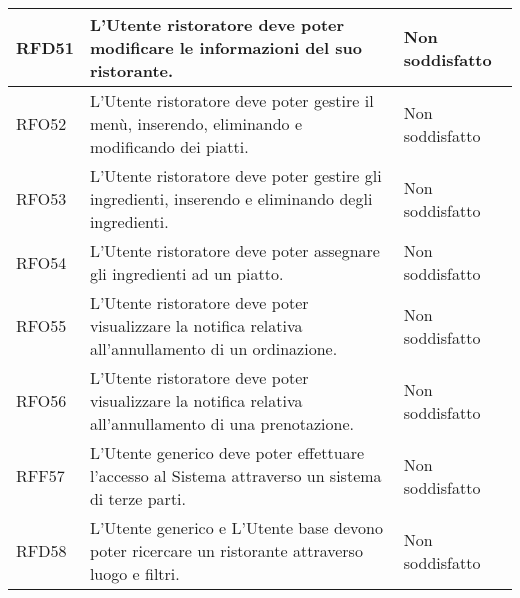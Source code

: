 \begin{longtable}{|l|p{}|p{3cm}|}
	\hline
	RFD51       & L'Utente ristoratore deve poter modificare le informazioni del suo ristorante.                                          & Non soddisfatto \\
	\hline
	RFO52       & L'Utente ristoratore deve poter gestire il menù, inserendo, eliminando e modificando dei piatti.                        & Non soddisfatto \\
	\hline
	RFO53       & L'Utente ristoratore deve poter gestire gli ingredienti, inserendo e eliminando degli ingredienti.                      & Non soddisfatto \\
	\hline
	RFO54       & L'Utente ristoratore deve poter assegnare gli ingredienti ad un piatto.                                                 & Non soddisfatto \\
	\hline
	RFO55       & L'Utente ristoratore deve poter visualizzare la notifica relativa all'annullamento di un ordinazione.                   & Non soddisfatto \\
	\hline
	RFO56       & L'Utente ristoratore deve poter visualizzare la notifica relativa all'annullamento di una prenotazione.                 & Non soddisfatto \\
	\hline
	RFF57       & L'Utente generico deve poter effettuare l'accesso al Sistema attraverso un sistema di terze parti.                 	& Non soddisfatto \\
	\hline
	RFD58	   & L'Utente generico e L'Utente base devono poter ricercare un ristorante attraverso luogo e filtri.  					& Non soddisfatto \\
	\hline
\end{longtable}
